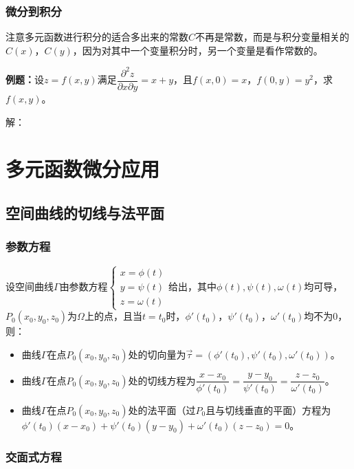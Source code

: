 \documentclass[UTF8, 12pt]{ctexart}
\begin{document}
\subsubsection{微分到积分}

注意多元函数进行积分的适合多出来的常数$C$不再是常数，而是与积分变量相关的$C(x)$，$C(y)$，因为对其中一个变量积分时，另一个变量是看作常数的。

\textbf{例题：}设$z=f(x,y)$满足$\dfrac{\partial^2z}{\partial x\partial y}=x+y$，且$f(x,0)=x$，$f(0,y)=y^2$，求$f(x,y)$。

解：

\section{多元函数微分应用}

\subsection{空间曲线的切线与法平面}

\subsubsection{参数方程}

设空间曲线$\varGamma$由参数方程$\left\{\begin{array}{l}
    x=\phi(t) \\
    y=\psi(t) \\
    z=\omega(t)
\end{array}\right.$给出，其中$\phi(t),\psi(t),\omega(t)$均可导，$P_0(x_0,y_0,z_0)$为$\varOmega$上的点，且当$t=t_0$时，$\phi'(t_0)$，$\psi'(t_0)$，$\omega'(t_0)$均不为0，则：

\begin{itemize}
    \item 曲线$\varGamma$在点$P_0(x_0,y_0,z_0)$处的切向量为$\vec{\tau}=(\phi'(t_0),\psi'(t_0),\omega'(t_0))$。
    \item 曲线$\varGamma$在点$P_0(x_0,y_0,z_0)$处的切线方程为$\dfrac{x-x_0}{\phi'(t_0)}=\dfrac{y-y_0}{\psi'(t_0)}=\dfrac{z-z_0}{\omega'(t_0)}$。
    \item 曲线$\varGamma$在点$P_0(x_0,y_0,z_0)$处的法平面（过$P_0$且与切线垂直的平面）方程为$\phi'(t_0)(x-x_0)+\psi'(t_0)(y-y_0)+\omega'(t_0)(z-z_0)=0$。
\end{itemize}

\subsubsection{交面式方程}
\end{document}
